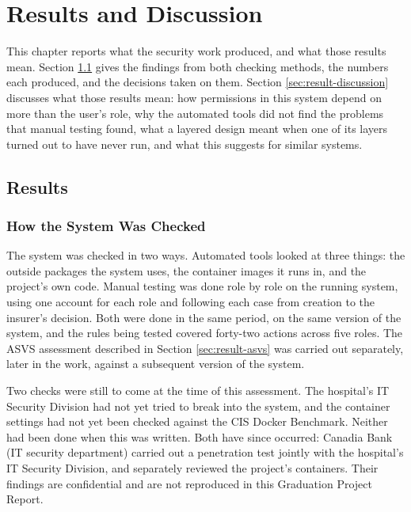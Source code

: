 \chapter{Results and Discussion}
\label{chap:result}

This chapter reports what the security work produced, and what those results mean. Section \ref{sec:result-result} gives the findings from both checking methods, the numbers each produced, and the decisions taken on them. Section \ref{sec:result-discussion} discusses what those results mean: how permissions in this system depend on more than the user's role, why the automated tools did not find the problems that manual testing found, what a layered design meant when one of its layers turned out to have never run, and what this suggests for similar systems.

\section{Results}
\label{sec:result-result}

\subsection{How the System Was Checked}

The system was checked in two ways. Automated tools looked at three things: the outside packages the system uses, the container images it runs in, and the project's own code. Manual testing was done role by role on the running system, using one account for each role and following each case from creation to the insurer's decision. Both were done in the same period, on the same version of the system, and the rules being tested covered forty-two actions across five roles. The ASVS assessment described in Section \ref{sec:result-asvs} was carried out separately, later in the work, against a subsequent version of the system.

Two checks were still to come at the time of this assessment. The hospital's IT Security Division had not yet tried to break into the system, and the container settings had not yet been checked against the CIS Docker Benchmark. Neither had been done when this was written. Both have since occurred: Canadia Bank (IT security department) carried out a penetration test jointly with the hospital's IT Security Division, and separately reviewed the project's containers. Their findings are confidential and are not reproduced in this Graduation Project Report.

